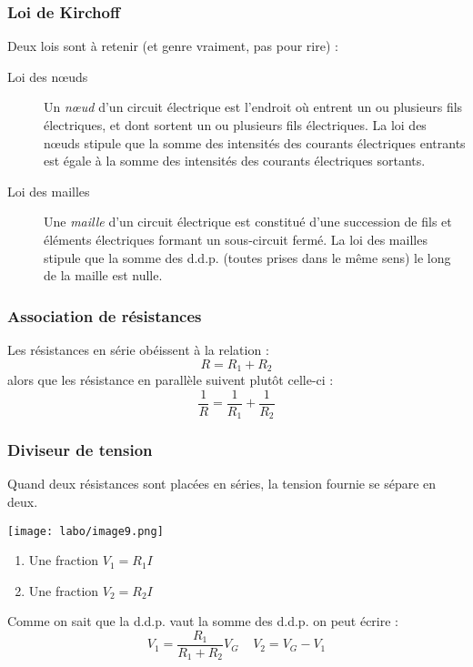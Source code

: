\documentclass[british,french,11pt, a4paper, openany]{book}
\begin{document}
		\subsubsection*{Loi de Kirchoff}
		Deux lois sont à retenir (et genre vraiment, pas pour rire) : 
		\begin{description}
			\item[Loi des nœuds] Un \textit{nœud} d'un circuit électrique est l'endroit où entrent un ou plusieurs fils électriques, et dont sortent un ou plusieurs fils électriques. La loi des nœuds stipule que la somme des intensités des courants électriques entrants est égale à la somme des intensités des courants électriques sortants.
			\item[Loi des mailles] Une \textit{maille} d'un circuit électrique est constitué d'une succession de fils et éléments électriques formant un sous-circuit fermé. La loi des mailles stipule que la somme des d.d.p. (toutes prises dans le même sens) le long de la maille est nulle.
		\end{description}
		
		
		\subsubsection*{Association de résistances}
		Les résistances en série obéissent à la relation :
		\begin{equation}
			R = R_1 + R_2
		\end{equation}
		alors que les résistance en parallèle suivent plutôt celle-ci :
		\begin{equation}
			\frac{1}{R} = \frac{1}{R_1} + \frac{1}{R_2}
		\end{equation}
		
		\subsubsection*{Diviseur de tension}
		Quand deux résistances sont placées en séries, la tension fournie se sépare en deux.
		\begin{center}
			\texttt{[image: labo/image9.png]}
		\end{center}
		\begin{enumerate}
			\item Une fraction $V_1 = R_1I$
			\item Une fraction $V_2 = R_2I$
		\end{enumerate}
		Comme on sait que la d.d.p. vaut la somme des d.d.p. on peut écrire : 
		\begin{equation}
			V_1 = \frac{R_1}{R_1 + R_2}V_G\ \ \ \ \ V_2 = V_G - V_1
		\end{equation}
		
\end{document}
